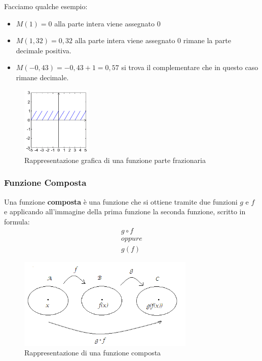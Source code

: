 \documentclass{article}
\theoremstyle{definition}
\begin{document}
Facciamo qualche esempio:
\begin{itemize}
        \item $ M(1) = 0 $ alla parte intera viene assegnato $ 0 $  
        \item $ M(1,32) = 0,32 $ alla parte intera viene assegnato $ 0 $ rimane la parte decimale positiva.
        \item $ M(-0,43) = -0,43 + 1 = 0,57 $ si trova il complementare che in questo caso rimane decimale. 
\end{itemize} 

\begin{figure}[!h]
        \centering
                \includegraphics[width=0.3\textwidth]{esempio_funzione_parte_frazionaria.png}
                \caption{Rappresentazione grafica di una funzione parte frazionaria}\label{fig:esempio_funzione_parte_frazionaria}
\end{figure}



\subsubsection{Funzione Composta}\label{sec:funzione_composta}
Una funzione \textbf{composta} è una funzione che si ottiene tramite due funzioni $ g $ e $ f $ e applicando all'immagine della prima funzione la seconda funzione, scritto in formula:
\begin{align*}
        g \circ f \\
        oppure \\
        g(f)
\end{align*}

\begin{figure}[h]
        \centering
                \includegraphics[width=0.75\textwidth]{esempio_funzione_composta.png}
                \caption{Rappresentazione di una funzione composta}\label{fig:esempio_funzione_composta}
\end{figure}
\end{document}
